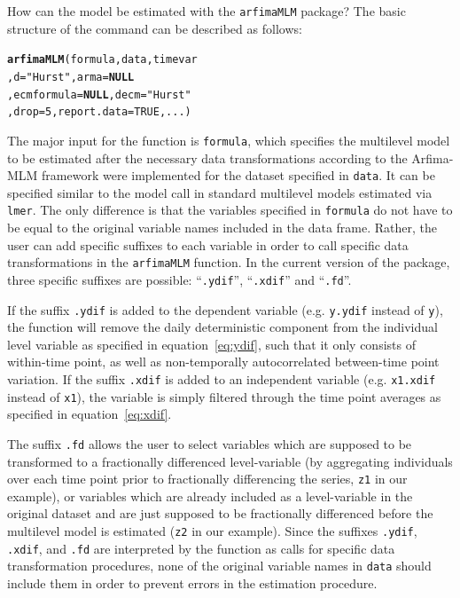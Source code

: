 \documentclass[12pt]{paper}\usepackage[]{graphicx}\usepackage[]{color}
\makeatletter
\newcommand{\hlnum}[1]{\textcolor[rgb]{0.686,0.059,0.569}{#1}}%
\newcommand{\hlstr}[1]{\textcolor[rgb]{0.192,0.494,0.8}{#1}}%
\newcommand{\hlstd}[1]{\textcolor[rgb]{0.345,0.345,0.345}{#1}}%
\newcommand{\hlkwa}[1]{\textcolor[rgb]{0.161,0.373,0.58}{\textbf{#1}}}%
\newcommand{\hlkwc}[1]{\textcolor[rgb]{0.333,0.667,0.333}{#1}}%
\newcommand{\hlkwd}[1]{\textcolor[rgb]{0.737,0.353,0.396}{\textbf{#1}}}%
\newenvironment{kframe}{%
 \def\at@end@of@kframe{}%
 \ifinner\ifhmode%
  \def\at@end@of@kframe{\end{minipage}}%
  \begin{minipage}{\columnwidth}%
 \fi\fi%
 \def\FrameCommand##1{\hskip\@totalleftmargin \hskip-\fboxsep
 \colorbox{shadecolor}{##1}\hskip-\fboxsep
     \hskip-\linewidth \hskip-\@totalleftmargin \hskip\columnwidth}%
 \MakeFramed {\advance\hsize-\width
   \@totalleftmargin\z@ \linewidth\hsize
   \@setminipage}}%
 {\par\unskip\endMakeFramed%
 \at@end@of@kframe}
\newenvironment{knitrout}{}{} %
\makeatother
\begin{document}
How can the model be estimated with the \texttt{arfimaMLM} package? The basic structure of the command can be described as follows:

\begin{knitrout}
\color{fgcolor}\begin{kframe}
\begin{alltt}
\hlkwd{arfimaMLM}\hlstd{(formula, data, timevar}
          \hlstd{,} \hlkwc{d} \hlstd{=} \hlstr{"Hurst"}\hlstd{,} \hlkwc{arma} \hlstd{=} \hlkwa{NULL}
          \hlstd{,} \hlkwc{ecmformula} \hlstd{=} \hlkwa{NULL}\hlstd{,} \hlkwc{decm} \hlstd{=} \hlstr{"Hurst"}
          \hlstd{,} \hlkwc{drop} \hlstd{=} \hlnum{5}\hlstd{,} \hlkwc{report.data} \hlstd{=} \hlnum{TRUE}\hlstd{, ...)}
\end{alltt}
\end{kframe}
\end{knitrout}

The major input for the function is \texttt{formula}, which specifies the multilevel model to be estimated after the necessary data transformations according to the Arfima-MLM framework were implemented for the dataset specified in \texttt{data}. It can be specified similar to the model call in standard multilevel models estimated via \texttt{lmer}. The only difference is that the variables specified in \texttt{formula} do not have to be equal to the original variable names included in the data frame. Rather, the user can add specific suffixes to each variable in order to call specific data transformations in the \texttt{arfimaMLM} function. In the current version of the package, three specific suffixes are possible: ``\texttt{.ydif}'', ``\texttt{.xdif}'' and ``\texttt{.fd}''.

If the suffix \texttt{.ydif} is added to the dependent variable (e.g. \texttt{y.ydif} instead of \texttt{y}), the function will remove the daily deterministic component from the individual level variable as specified in equation~\eqref{eq:ydif}, such that it only consists of within-time point, as well as non-temporally autocorrelated between-time point variation. If the suffix \texttt{.xdif} is added to an independent variable (e.g. \texttt{x1.xdif} instead of \texttt{x1}), the variable is simply filtered through the time point averages as specified in equation~\eqref{eq:xdif}.

The suffix \texttt{.fd} allows the user to select variables which are supposed to be transformed to a fractionally differenced level-variable (by aggregating individuals over each time point prior to fractionally differencing the series, \texttt{z1} in our example), or variables which are already included as a level-variable in the original dataset and are just supposed to be fractionally differenced before the multilevel model is estimated (\texttt{z2} in our example). Since the suffixes \texttt{.ydif}, \texttt{.xdif}, and \texttt{.fd} are interpreted by the function as calls for specific data transformation procedures, none of the original variable names in \texttt{data} should include them in order to prevent errors in the estimation procedure.
\end{document}
